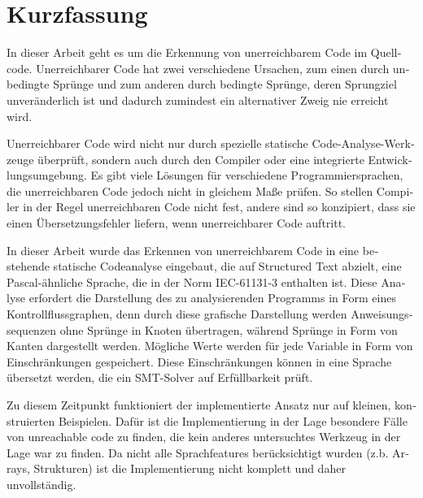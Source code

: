\chapter{Kurzfassung}

\begin{german}
In dieser Arbeit geht es um die Erkennung von unerreichbarem Code im Quellcode. 
Unerreichbarer Code hat zwei verschiedene Ursachen, zum einen durch unbedingte Sprünge und zum anderen durch bedingte Sprünge, deren Sprungziel unveränderlich ist und dadurch zumindest ein alternativer Zweig nie erreicht wird.

Unerreichbarer Code wird nicht nur durch spezielle statische Code-Analyse-Werkzeuge überprüft, sondern auch durch den Compiler oder eine integrierte Entwicklungsumgebung. Es gibt viele Lösungen für verschiedene Programmiersprachen, die unerreichbaren Code jedoch nicht in gleichem Maße prüfen. So stellen Compiler in der Regel unerreichbaren Code nicht fest, andere sind so konzipiert, dass sie einen Übersetzungsfehler liefern, wenn unerreichbarer Code auftritt.


In dieser Arbeit wurde das Erkennen von unerreichbarem Code in eine bestehende statische Codeanalyse eingebaut, die auf Structured Text abzielt, eine Pascal-ähnliche Sprache, die in der Norm IEC-61131-3 enthalten ist. Diese Analyse erfordert die Darstellung des zu analysierenden Programms in Form eines Kontrollflussgraphen, denn durch diese grafische Darstellung werden Anweisungssequenzen ohne Sprünge in Knoten übertragen, während Sprünge in Form von Kanten dargestellt werden. Mögliche Werte werden für jede Variable in Form von Einschränkungen gespeichert. Diese Einschränkungen können in eine Sprache übersetzt werden, die ein SMT-Solver auf Erfüllbarkeit prüft. 

Zu diesem Zeitpunkt funktioniert der implementierte Ansatz nur auf kleinen, konstruierten Beispielen. Dafür ist die Implementierung in der Lage besondere Fälle von unreachable code zu finden, die kein anderes untersuchtes Werkzeug in der Lage war zu finden. Da nicht alle Sprachfeatures berücksichtigt wurden (z.b. Arrays, Strukturen) ist die Implementierung nicht komplett und daher unvollständig.
\end{german}